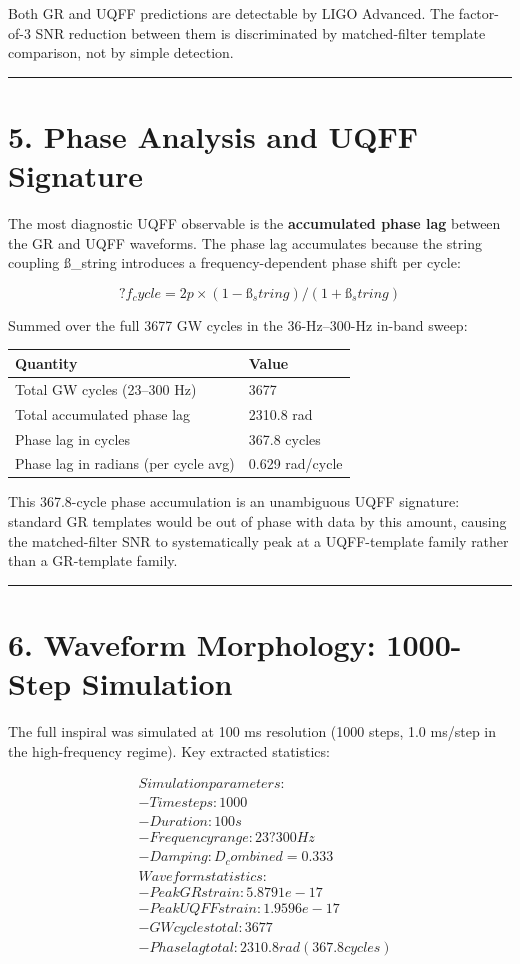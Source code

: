 \documentclass[11pt]{article}
\begin{document}
Both GR and UQFF predictions are detectable by LIGO Advanced. The factor-of-3 SNR reduction between them is discriminated by matched-filter template comparison, not by simple detection.

\noindent\rule{\textwidth}{0.4pt}

\section*{5. Phase Analysis and UQFF Signature}

The most diagnostic UQFF observable is the \textbf{accumulated phase lag} between the GR and UQFF waveforms. The phase lag accumulates because the string coupling ß\_string introduces a frequency-dependent phase shift per cycle:

$$
?f_cycle = 2p \times (1 - ß_string) / (1 + ß_string)
$$

Summed over the full 3677 GW cycles in the 36-Hz--300-Hz in-band sweep:

\begin{center}
\begin{longtable}{ll}
\toprule
Quantity & Value \tabularnewline
\midrule
\endhead
Total GW cycles (23--300 Hz) & 3677 \tabularnewline
Total accumulated phase lag & 2310.8 rad \tabularnewline
Phase lag in cycles & 367.8 cycles \tabularnewline
Phase lag in radians (per cycle avg) & 0.629 rad/cycle \tabularnewline
\bottomrule
\end{longtable}
\end{center}

This 367.8-cycle phase accumulation is an unambiguous UQFF signature: standard GR templates would be out of phase with data by this amount, causing the matched-filter SNR to systematically peak at a UQFF-template family rather than a GR-template family.

\noindent\rule{\textwidth}{0.4pt}

\section*{6. Waveform Morphology: 1000-Step Simulation}

The full inspiral was simulated at 100 ms resolution (1000 steps, 1.0 ms/step in the high-frequency regime). Key extracted statistics:

$$
\begin{aligned}
  & Simulation parameters: \\
  & - Time steps: 1000 \\
  & - Duration: 100 s \\
  & - Frequency range: 23 ? 300 Hz \\
  & - Damping: D_combined = 0.333 \\
  & Waveform statistics: \\
  & - Peak GR strain:   5.8791e-17 \\
  & - Peak UQFF strain: 1.9596e-17 \\
  & - GW cycles total:  3677 \\
  & - Phase lag total:  2310.8 rad (367.8 cycles)
\end{aligned}
$$
\end{document}
